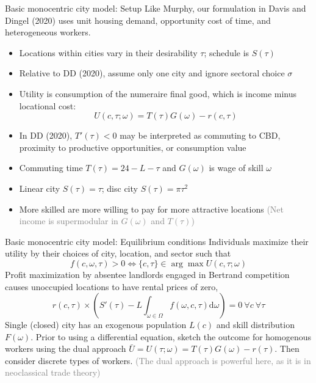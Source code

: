 \documentclass[11pt,notes=hide,aspectratio=169]{beamer}
\begin{document}
\begin{frame}{Basic monocentric city model: Setup}
Like Murphy, our formulation in Davis and Dingel (2020)
uses unit housing demand, opportunity cost of time, and heterogeneous workers.
\begin{itemize}
\item Locations within cities vary in their desirability $\tau$; schedule is $S(\tau)$ 
\item Relative to DD (2020), assume only one city and ignore sectoral choice $\sigma$
\item Utility is consumption of the numeraire final good, which is income minus locational cost:
\begin{equation*}
U(c,\tau;\omega)
=
T(\tau)G(\omega)-r(c,\tau)
\end{equation*}
\item In DD (2020), $T'(\tau)<0$ may be interpreted as commuting to CBD, proximity to
productive opportunities, or consumption value
\item Commuting time $T(\tau) = 24 - L - \tau$ and $G(\omega)$ is wage of skill $\omega$
\item Linear city $S(\tau) = \tau$; disc city $S(\tau) = \pi \tau^{2}$
\item More skilled are more willing to pay for more attractive locations
\textcolor{gray}{(Net income is supermodular in $G(\omega)$ and $T(\tau)$)}
\end{itemize}
\end{frame}
\begin{frame}{Basic monocentric city model: Equilibrium conditions}
Individuals maximize their utility by their choices of city, location, and sector such that
\begin{equation*}
f(c,\omega,\tau)>0\iff\{c,\tau\}\in\arg\max U(c,\tau;\omega)
\end{equation*}
Profit maximization by absentee landlords engaged in Bertrand competition causes unoccupied locations to have rental prices of zero,
\begin{equation*}
r(c,\tau)\times\left(S'(\tau)-L \int_{\omega\in\Omega}f(\omega,c,\tau)\textrm{d}\omega\right)=0\ \forall c\ \forall\tau
\end{equation*}
Single (closed) city has an exogenous population $L(c)$ and skill distribution $F(\omega)$.
\medskip
Prior to using a differential equation,
sketch the outcome for homogenous workers using the dual approach 
$\bar{U} = U(\tau; \omega) = T(\tau) G(\omega) - r(\tau)$.
Then consider discrete types of workers.
\textcolor{gray}{(The dual approach is powerful here, as it is in neoclassical trade theory)}
\end{frame}
\end{document}
